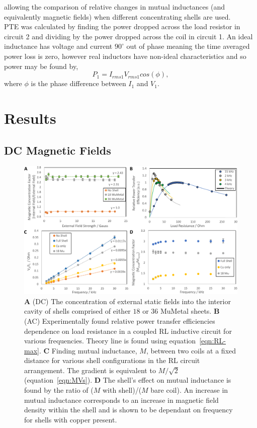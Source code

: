 \documentclass[11pt]{iopart}
\begin{document}
allowing the comparison of relative changes in mutual inductances (and
equivalently magnetic fields) when different concentrating shells are
used. \\
PTE was calculated by finding the power dropped across the load
resistor in circuit 2 and dividing by the power dropped across the
coil in circuit 1. An ideal inductance has voltage and current
$90^\circ$ out of phase meaning the time averaged power loss is zero,
however real inductors have non-ideal characteristics and so power may
be found by,
\begin{equation}
    P_1 = I_{rms1}V_{rms1}cos(\phi),
\label{eqn:P1}
\end{equation}
where $\phi$ is the phase difference between $I_1$ and $V_1$.

\section{Results}
\subsection{DC Magnetic Fields}

\begin{figure}
  \begin{center}
   \noindent\includegraphics[width=\linewidth]{images/compoundRL.pdf}
  \end{center}
  \caption{
    \textbf{A} (DC) The concentration of external static fields into
    the interior cavity of shells comprised of either $18$ or $36$
    MuMetal sheets.
    \textbf{B} (AC) Experimentally found relative power transfer
    efficiencies dependence on load resistance in a coupled RL
    inductive circuit for various frequencies. Theory line is found
    using equation~\ref{eqn:RL-max}.
    \textbf{C} Finding mutual inductance, $M$, between two coils at a
    fixed distance for various shell configurations in the RL circuit
    arrangement.  The gradient is equivalent to $M/\sqrt{2}$
    (equation~\ref{eqn:MVs}).
    \textbf{D} The shell's effect on mutual inductance is found by the
    ratio of ($M$ with shell)/($M$ bare coil). An increase in mutual
    inductance corresponds to an increase in magnetic field density
    within the shell and is shown to be dependant on frequency for
    shells with copper present.}
  \label{fig:DC_RL}
\end{figure}
\end{document}
